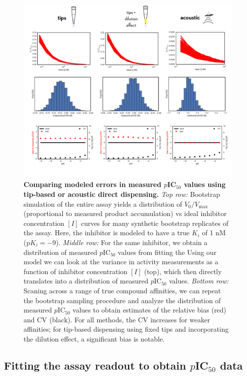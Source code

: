 \documentclass[aps,pre,twocolumn,nofootinbib,superscriptaddress,linenumbers]{revtex4-1}
\begin{document}
\begin{figure}[tb]
\includegraphics[width=1.0\textwidth]{../figures/acoustic-vs-tips.pdf}
  
  \caption{{\bf Comparing modeled errors in measured $p$IC$_{50}$ values using tip-based or acoustic direct dispensing.}
  \emph{Top row:} Bootstrap simulation of the entire assay yields a distribution of $V_0/V_\mathrm{max}$ (proportional to measured product accumulation) vs ideal inhibitor concentration $[I]$ curves for many synthetic bootstrap replicates of the assay.  
  Here, the inhibitor is modeled to have a true $K_i$ of 1 nM (p$K_i = -9$).
  \emph{Middle row:} For the same inhibitor, we obtain a distribution of measured $p$IC$_{50}$ values from fitting the Using our model we can look at the variance in activity measurements as a function of inhibitor concentration $[I]$ (top), which then directly translates into a distribution of measured $p$IC$_{50}$ values.
  \emph{Bottom row:} Scaning across a range of true compound affinities, we can repeat the bootstrap sampling procedure and analyze the distribution of measured $p$IC$_{50}$ values to obtain estimates of the relative bias (red) and CV (black).
  For all methods, the CV increases for weaker affinities; for tip-based dispensing using fixed tips and incorporating the dilution effect, a significant bias is notable.
  }
  \label{fig:acoustic-vs-tips}
\end{figure}

\subsection*{Fitting the assay readout to obtain $p$IC$_{50}$ data}
\end{document}

